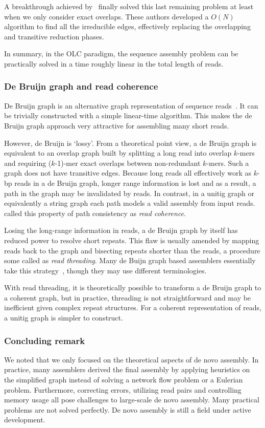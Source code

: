 \documentclass{bioinfo}
\begin{document}
\begin{methods}
A breakthrough achieved by~\citet{Simpson:2010uq} finally solved
this last remaining problem at least when we only consider exact overlaps.
These authors developed a $O(N)$ algorithm to find all the irreducible edges,
effectively replacing the overlapping and transitive reduction phases.

In summary, in the OLC paradigm, the sequence assembly problem can be
practically solved in a time roughly linear in the total length of reads.

\subsubsection{De Bruijn graph and read coherence}
De Bruijn graph is an alternative graph representation of sequence
reads~\citep{Idury:1995oq}.  It can be trivially constructed with a simple
linear-time algorithm. This makes the de Bruijn graph approach very attractive
for assembling many short reads.

However, de Bruijn is `lossy'. From a theoretical point view, a de Bruijn graph
is equivalent to an overlap graph built by splitting a long read into overlap
$k$-mers and requiring ($k$-1)-mer exact overlaps between non-redundant
$k$-mers.  Such a graph does not have transitive edges. Because long reads all
effectively work as $k$-bp reads in a de Bruijn graph, longer range information
is lost and as a result, a path in the graph may be invalidated by reads. In
contrast, in a unitig graph or equivalently a string graph each path models a
valid assembly from input reads. \citet{Myers:2005bh} called this property of
path consistency as \emph{read coherence}.

Losing the long-range information in reads, a de Bruijn graph by itself has
reduced power to resolve short repeats. This flaw is usually amended by mapping
reads back to the graph and bisecting repeats shorter than the reads, a procedure
some called as \emph{read threading}. Many de Buijn graph based assemblers
essentially take this
strategy~\citep{Pevzner:2001vn,Chaisson:2009fk,Zerbino:2009ly,Li:2010vn},
though they may use different terminologies.

With read threading, it is theoretically possible to transform a de Bruijn graph
to a coherent graph, but in practice, threading is not straightforward and
may be inefficient given complex repeat structures. For a coherent representation
of reads, a unitig graph is simpler to construct.

\subsubsection{Concluding remark}
We noted that we only focused on the theoretical aspects of de novo assembly.
In practice, many assemblers derived the final assembly by applying heuristics
on the simplified graph instead of solving a network flow problem or a Eulerian
problem. Furthermore, correcting errors, utilizing read pairs and controlling memory
usage all pose challenges to large-scale de novo assembly. Many practical
problems are not solved perfectly. De novo assembly is still a field under
active development.


\end{methods}
\end{document}
